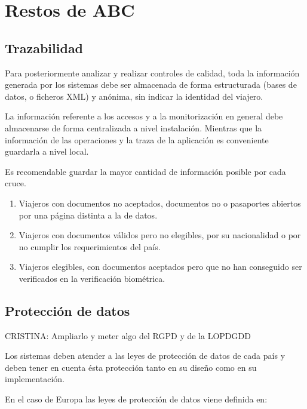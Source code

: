 \chapter{Restos de ABC}\label{apendix:restosDeABC}

\section{Trazabilidad}\label{sec:Trazabilidad}

Para posteriormente analizar y realizar controles de calidad, toda la información generada por los sistemas  debe ser almacenada de forma estructurada (bases de datos, o ficheros XML) y anónima, sin indicar la identidad del viajero. 

La información referente a los accesos y a la monitorización en general debe almacenarse de forma centralizada a nivel instalación. Mientras que la información de las operaciones y la traza de la aplicación es conveniente guardarla a nivel local.

Es recomendable guardar la mayor cantidad de información posible por cada cruce.
\begin{enumerate}
    \item 
    Viajeros con documentos no aceptados, documentos no  o pasaportes abiertos por una página distinta a la de datos.
    \item 
    Viajeros con documentos válidos pero no elegibles, por su nacionalidad o por no cumplir los requerimientos del país.
    \item 
    Viajeros elegibles, con documentos aceptados pero que no han conseguido ser verificados en la verificación biométrica.   
\end{enumerate}


\section{Protección de datos}\label{sec:ProtecionDatosABC}

\color{magenta} CRISTINA: Ampliarlo y meter algo del RGPD y de la LOPDGDD \color{black}

\color{cyan}
Los sistemas deben atender a las leyes de protección de datos de cada país y deben tener en cuenta ésta protección tanto en su diseño como en su implementación.

En el caso de Europa \cite{EUOnline} las leyes de protección de datos viene definida en:

